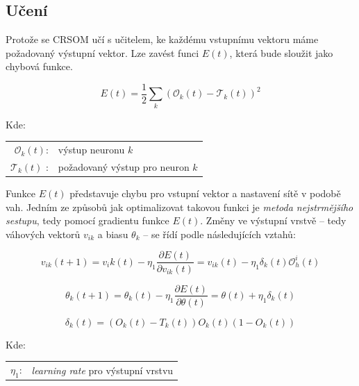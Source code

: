 \documentclass[thesis=M,czech]{FITthesis}[2012/06/26]
\begin{document}
\subsection{Učení}
Protože se CRSOM učí s učitelem, ke každému vstupnímu vektoru máme požadovaný výstupní vektor. Lze zavést funci $E(t)$, která bude sloužit jako chybová funkce.

\vspace{\baselineskip}
\noindent
\begin{minipage}[c]{\textwidth }

\begin{equation}
   E(t)=\frac{1}{2}\sum\limits_k{(\mathcal{O}_k(t)-\mathcal{T}_k(t))^2}  
\end{equation}


Kde:\\
\hspace*{3em}
\begin{tabular}{rl}
    $\mathcal{O}_k(t)$:& výstup neuronu $k$ \\
    $\mathcal{T}_k(t) $ :& požadovaný výstup pro neuron $k$ \\

\end{tabular}
\end{minipage} 
\vspace{\baselineskip}
\noindent


Funkce $E(t)$ představuje chybu pro vstupní vektor a nastavení sítě v podobě vah. Jedním ze způsobů jak optimalizovat takovou funkci je \textit{metoda nejstrmějšího sestupu}, tedy pomocí gradientu funkce $E(t)$. Změny ve výstupní vrstvě -- tedy váhových vektorů $v_{ik}$ a biasu $ \theta_k$ -- se řídí podle následujících vztahů:

\vspace{\baselineskip}
\noindent
\begin{minipage}[c]{\textwidth }

\begin{equation*}
   v_{ik}(t+1)=v_ik(t) - \eta_1\frac{\partial{E(t)}}{\partial{v_{ik}(t)}} =  v_{ik}(t) - \eta_1\delta_k(t)\mathcal{O}_h^i(t) 
\end{equation*}

\begin{equation*}
   \theta_k(t+1)=\theta_k(t) - \eta_1\frac{\partial{E(t)}}{\partial{\theta(t)}} = \theta(t)  + \eta_1\delta_k(t)
\end{equation*}

\begin{equation*}
   \delta_k(t) = (O_k(t) - T_k(t))O_k(t)(1-O_k(t)) 
\end{equation*}

Kde:\\
\hspace*{3em}
\begin{tabular}{rl}
    $\eta_1$:& \textit{learning rate} pro výstupní vrstvu \\
\end{tabular}
\end{minipage} 
\vspace{\baselineskip}
\noindent
\end{document}
